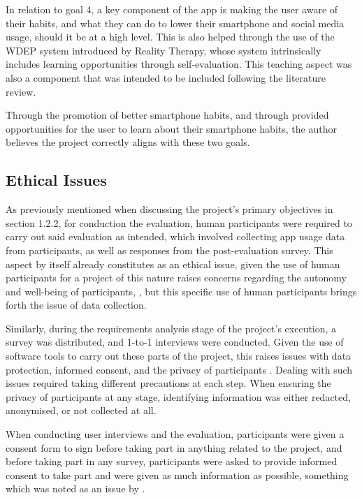 \documentclass[12pt]{article}
\begin{document}
In relation to goal 4, a key component of the app is making the user aware of their habits, and what they can do to lower their smartphone and social media usage, should it be at a high level. This is
also helped through the use of the WDEP system introduced by Reality Therapy, whose system intrinsically includes learning opportunities through self-evaluation. This teaching aspect was also a 
component that was intended to be included following the literature review. \newline

Through the promotion of better smartphone habits, and through provided opportunities for the user to learn about their smartphone habits, the author believes the project correctly aligns with
these two goals.

\subsection{Ethical Issues}
As previously mentioned when discussing
the project's primary objectives in section 1.2.2, for conduction the evaluation, human participants were required to carry out said
evaluation as intended, which involved collecting app usage data from participants, as well as responses from the post-evaluation survey.
 This aspect by itself already constitutes as an ethical issue, given the use of human participants for a project
of this nature raises concerns regarding the autonomy and well-being of participants,
, but this specific use of human participants brings forth the issue of data collection. \newline

Similarly, during the requirements analysis stage of the project's execution, a survey was distributed, and 1-to-1 interviews were 
conducted. Given the use of software tools to carry out these parts of the project, this raises issues with data protection, informed 
consent, and the privacy of participants . Dealing with such issues required taking different precautions 
at each step. When ensuring the privacy of participants at any stage, identifying information was either redacted, anonymised, or not 
collected at all. \newline

When conducting user interviews and the evaluation, participants were given a consent form to sign before taking part in anything related 
to the project, and before taking part in any survey, participants were asked to provide informed consent to take part and were given as 
much information as possible, something which was noted as an issue by . \newline
\end{document}
